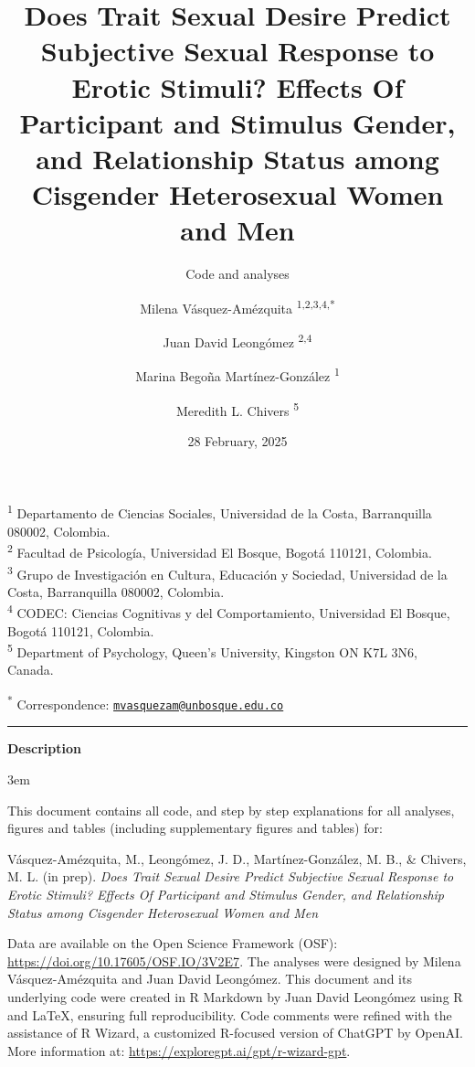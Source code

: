 \documentclass[
  bookmarksnumbered]{article}
\title{Does Trait Sexual Desire Predict Subjective Sexual Response to Erotic Stimuli? Effects Of Participant and Stimulus Gender, and Relationship Status among Cisgender Heterosexual Women and Men}
\subtitle{Code and analyses}
\author{Milena Vásquez-Amézquita \orcidlink{0000-0001-7317-8430}\textsuperscript{1,2,3,4,*} \and Juan David Leongómez \orcidlink{0000-0002-0092-6298}\textsuperscript{2,4} \and Marina Begoña Martínez-González \orcidlink{0000-0002-5840-6383}\textsuperscript{1} \and Meredith L. Chivers \orcidlink{0000-0002-5495-9263}\textsuperscript{5}}
\date{28 February, 2025}
\begin{document}
\maketitle

\textsuperscript{1} Departamento de Ciencias Sociales, Universidad de la Costa, Barranquilla 080002, Colombia.\\
\textsuperscript{2} Facultad de Psicología, Universidad El Bosque, Bogotá 110121, Colombia.\\
\textsuperscript{3} Grupo de Investigación en Cultura, Educación y Sociedad, Universidad de la Costa, Barranquilla 080002, Colombia.\\
\textsuperscript{4} CODEC: Ciencias Cognitivas y del Comportamiento, Universidad El Bosque, Bogotá 110121, Colombia.\\
\textsuperscript{5} Department of Psychology, Queen's University, Kingston ON K7L 3N6, Canada.

\textsuperscript{*} Correspondence: \href{mailto:mvasquezam@unbosque.edu.co}{\href{mailto:mvasquezam@unbosque.edu.co}{\nolinkurl{mvasquezam@unbosque.edu.co}}}

\begin{center}\rule{0.5\linewidth}{0.5pt}\end{center}

\begin{center}
\textbf{Description}
\end{center}

\par
\begingroup
\leftskip3em
\rightskip\leftskip

This document contains all code, and step by step explanations for all analyses, figures and tables (including supplementary figures and tables) for:

\begin{hangparas}{.25in}{1}
Vásquez-Amézquita, M., Leongómez, J. D., Martínez-González, M. B., \& Chivers, M. L. (in prep). \textit{Does Trait Sexual Desire Predict Subjective Sexual Response to Erotic Stimuli? Effects Of Participant and Stimulus Gender, and Relationship Status among Cisgender Heterosexual Women and Men}
\end{hangparas}

Data are available on the Open Science Framework (OSF): \url{https://doi.org/10.17605/OSF.IO/3V2E7}. The analyses were designed by Milena Vásquez-Amézquita and Juan David Leongómez. This document and its underlying code were created in R Markdown by Juan David Leongómez using R and \LaTeX, ensuring full reproducibility. Code comments were refined with the assistance of R Wizard, a customized R-focused version of ChatGPT by OpenAI. More information at: \url{https://exploregpt.ai/gpt/r-wizard-gpt}.
\end{document}
